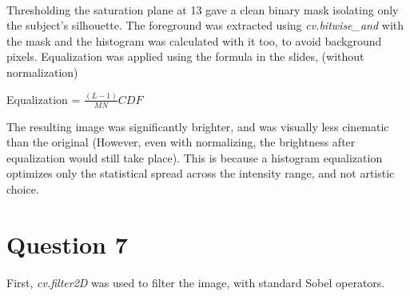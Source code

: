 \documentclass[11pt]{article}
\begin{document}
    \begin{center}
    \end{center}
    { \hspace*{\fill} \\}
    
    Thresholding the saturation plane at 13 gave a clean binary mask
isolating only the subject's silhouette. The foreground was extracted
using \emph{cv.bitwise\_and} with the mask and the histogram was
calculated with it too, to avoid background pixels. Equalization was
applied using the formula in the slides, (without normalization)

Equalization = \(\frac{(L-1)}{MN}CDF\)

The resulting image was significantly brighter, and was visually less
cinematic than the original (However, even with normalizing, the
brightness after equalization would still take place). This is because a
histogram equalization optimizes only the statistical spread across the
intensity range, and not artistic choice.

    \section{Question 7}\label{question-7}

    First, \emph{cv.filter2D} was used to filter the image, with standard
Sobel operators.
\end{document}
